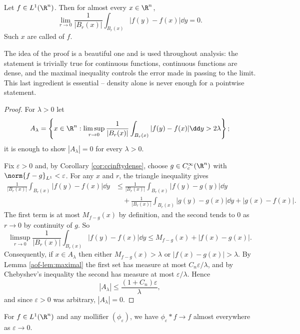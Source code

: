 \begin{theorem}\label{thm:lebdiff}
	Let $f \in L^1(\R^n)$. Then for almost every $x \in \R^n$,
	$$\lim_{r \to 0} \frac{1}{|B_r(x)|} \int_{B_r(x)} |f(y) - f(x)| \dd y = 0.$$
	Such $x$ are called  of $f$.
\end{theorem}

The idea of the proof is a beautiful one and is used throughout analysis: the statement is trivially true for continuous functions, continuous functions are dense, and the maximal inequality controls the error made in passing to the limit. This last ingredient is essential -- density alone is never enough for a pointwise statement.

\begin{proof}
	For $\lambda > 0$ let
	$$A_\lambda = \left\{ x \in \R^n : \limsup_{r \to 0}\frac{1}{|B_r(x)|}\int_{B_r(x)}|f(y)-f(x)| \dd y > 2\lambda \right\};$$
	it is enough to show $|A_\lambda| = 0$ for every $\lambda > 0$.

	Fix $\varepsilon > 0$ and, by Corollary \ref{cor:ccinftydense}, choose $g \in C_c^\infty(\R^n)$ with $\norm{f - g}_{L^1} < \varepsilon$. For any $x$ and $r$, the triangle inequality gives
	\begin{align*}
		\frac{1}{|B_r(x)|}\int_{B_r(x)}|f(y) - f(x)| \dd y &\le \frac{1}{|B_r(x)|}\int_{B_r(x)}|f(y) - g(y)|\dd y \\
		&\quad + \frac{1}{|B_r(x)|}\int_{B_r(x)}|g(y) - g(x)| \dd y + |g(x) - f(x)|.
	\end{align*}
	The first term is at most $M_{f-g}(x)$ by definition, and the second tends to $0$ as $r \to 0$ by continuity of $g$. So
	$$\limsup_{r \to 0}\frac{1}{|B_r(x)|}\int_{B_r(x)}|f(y)-f(x)|\dd y \le M_{f-g}(x) + |f(x) - g(x)|.$$
	Consequently, if $x \in A_\lambda$ then either $M_{f-g}(x) > \lambda$ or $|f(x)-g(x)| > \lambda$. By Lemma \ref{aof-lem:maximal} the first set has measure at most $C_n \varepsilon/\lambda$, and by Chebyshev's inequality the second has measure at most $\varepsilon/\lambda$. Hence
	$$|A_\lambda| \le \frac{(1 + C_n)\varepsilon}{\lambda},$$
	and since $\varepsilon > 0$ was arbitrary, $|A_\lambda| = 0$.
\end{proof}

\begin{corollary}
	For $f \in L^1(\R^n)$ and any mollifier $(\phi_\varepsilon)$, we have $\phi_\varepsilon * f \to f$ almost everywhere as $\varepsilon \to 0$.
\end{corollary}

